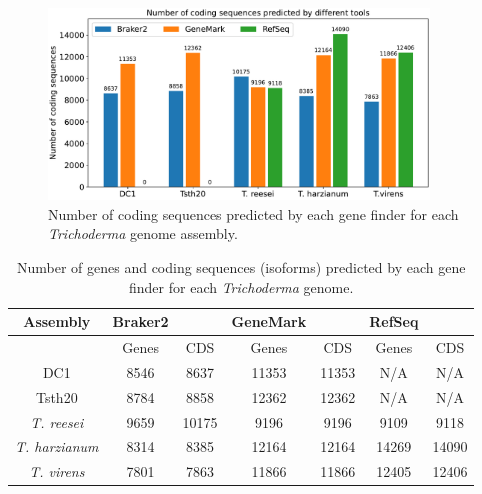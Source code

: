 \begin{figure}
  \centering
  \includegraphics[width=0.9\textwidth]{figures/cds-counts-barplot.pdf}
  \caption[Number of coding sequences predicted]{Number of coding sequences predicted by each gene finder for each \textit{Trichoderma} genome assembly.}\label{fig:cds-counts}
\end{figure}

\begin{table}
  \centering
  \begin{tabular}{|c|c|c|c|c|c|c|}
    \hline
    Assembly & Braker2 & & GeneMark & & RefSeq & \\ \hline
     & Genes & CDS & Genes & CDS & Genes & CDS \\ \hline
    DC1 & 8546 & 8637 & 11353 & 11353 & N/A & N/A \\ \hline
    Tsth20 & 8784 & 8858 & 12362 & 12362 & N/A & N/A \\ \hline
    \textit{T. reesei} & 9659 & 10175 & 9196 & 9196 & 9109 & 9118 \\ \hline
    \textit{T. harzianum} & 8314 & 8385 & 12164 & 12164 & 14269 & 14090 \\ \hline
    \textit{T. virens} & 7801 & 7863 & 11866 & 11866 & 12405 & 12406 \\ \hline
  \end{tabular}
  \caption[Number of genes and coding sequences predicted]{Number of genes and coding sequences
    (isoforms) predicted by each gene finder for each
    \textit{Trichoderma} genome.}\label{table:gene-counts}
\end{table}


